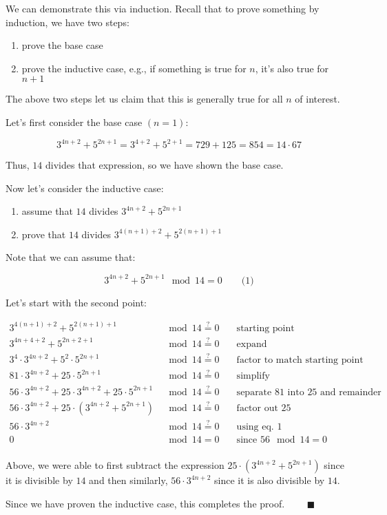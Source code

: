 We can demonstrate this via induction. Recall that to prove something by
induction, we have two steps:

\begin{enumerate}
\item prove the base case
\item prove the inductive case, e.g., if something is true for $n$, it's also
      true for $n+1$
\end{enumerate}

The above two steps let us claim that this is generally true for all $n$ of
interest.

Let's first consider the base case $(n = 1)$:

$$
  3^{4n + 2} + 5^{2n + 1} = 3^{4 + 2} + 5^{2 + 1} = 729 + 125 = 854 = 14 \cdot 67
$$

Thus, $14$ divides that expression, so we have shown the base case.

Now let's consider the inductive case:

\begin{enumerate}
\item assume that $14$ divides $3^{4n + 2} + 5^{2n + 1}$
\item prove that $14$ divides $3^{4(n+1) + 2} + 5^{2(n+1) + 1}$
\end{enumerate}

Note that we can assume that:

$$
  3^{4n + 2} + 5^{2n + 1} \mod 14 = 0 \qquad \text{(1)}
$$

Let's start with the second point:

$$
\begin{aligned}
3^{4(n+1) + 2} + 5^{2(n+1) + 1}             & \mod 14 \stackrel{?}{=} 0 & \quad \text{starting point} \\
3^{4n +4 + 2} + 5^{2n + 2 + 1}              & \mod 14 \stackrel{?}{=} 0 & \quad \text{expand} \\
3^4 \cdot 3^{4n + 2} + 5^2 \cdot 5^{2n + 1} & \mod 14 \stackrel{?}{=} 0 & \quad
                                              \text{factor to match starting point} \\
81 \cdot 3^{4n + 2} + 25 \cdot 5^{2n + 1}   & \mod 14 \stackrel{?}{=} 0 & \quad \text{simplify} \\
56 \cdot 3^{4n + 2} + 25 \cdot 3^{4n + 2} + 25 \cdot 5^{2n + 1}
                                            & \mod 14 \stackrel{?}{=} 0 & \quad \text{separate $81$ into $25$ and remainder} \\
56 \cdot 3^{4n + 2} + 25 \cdot (3^{4n + 2} + 5^{2n + 1})
                                            & \mod 14 \stackrel{?}{=} 0 & \quad \text{factor out $25$} \\
56 \cdot 3^{4n + 2}                         & \mod 14 \stackrel{?}{=} 0 & \quad \text{using eq. 1} \\
0                                           & \mod 14 = 0 & \quad \text{since $56 \mod 14 = 0$} \\
\end{aligned}
$$

Above, we were able to first subtract the expression $25 \cdot (3^{4n + 2} +
5^{2n + 1})$ since it is divisible by $14$ and then similarly, $56 \cdot 3^{4n
+ 2}$ since it is also divisible by $14$.

Since we have proven the inductive case, this completes the proof.
$\qquad \blacksquare$
